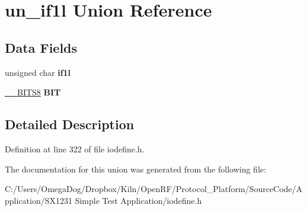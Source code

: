 \hypertarget{unionun__if1l}{\section{un\-\_\-if1l Union Reference}
\label{unionun__if1l}
}
\subsection*{Data Fields}
\begin{DoxyCompactItemize}
\item 
\hypertarget{unionun__if1l_aeccaddd8d337c0eacfc1940d65965577}{unsigned char {\bfseries if1l}}\label{unionun__if1l_aeccaddd8d337c0eacfc1940d65965577}

\item 
\hypertarget{unionun__if1l_a2357640693eb142bedd30285458c92ad}{\hyperlink{struct_____b_i_t_s8}{\-\_\-\-\_\-\-B\-I\-T\-S8} {\bfseries B\-I\-T}}\label{unionun__if1l_a2357640693eb142bedd30285458c92ad}

\end{DoxyCompactItemize}


\subsection{Detailed Description}


Definition at line 322 of file iodefine.\-h.



The documentation for this union was generated from the following file\-:\begin{DoxyCompactItemize}
\item 
C\-:/\-Users/\-Omega\-Dog/\-Dropbox/\-Kiln/\-Open\-R\-F/\-Protocol\-\_\-\-Platform/\-Source\-Code/\-Application/\-S\-X1231 Simple Test Application/iodefine.\-h\end{DoxyCompactItemize}
